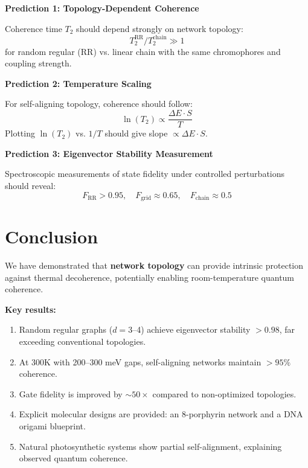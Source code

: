 \documentclass[11pt,a4paper]{article}
\theoremstyle{plain}
\theoremstyle{definition}
\theoremstyle{remark}
\begin{document}
\begin{prediction}
\textbf{Prediction 1: Topology-Dependent Coherence}

Coherence time $T_2$ should depend strongly on network topology:
\begin{equation}
T_2^{\text{RR}} / T_2^{\text{chain}} \gg 1
\end{equation}
for random regular (RR) vs. linear chain with the same chromophores and coupling strength.
\end{prediction}

\begin{prediction}
\textbf{Prediction 2: Temperature Scaling}

For self-aligning topology, coherence should follow:
\begin{equation}
\ln(T_2) \propto \frac{\Delta E \cdot S}{T}
\end{equation}
Plotting $\ln(T_2)$ vs. $1/T$ should give slope $\propto \Delta E \cdot S$.
\end{prediction}

\begin{prediction}
\textbf{Prediction 3: Eigenvector Stability Measurement}

Spectroscopic measurements of state fidelity under controlled perturbations should reveal:
\begin{equation}
F_{\text{RR}} > 0.95, \quad F_{\text{grid}} \approx 0.65, \quad F_{\text{chain}} \approx 0.5
\end{equation}
\end{prediction}

\section{Conclusion}

We have demonstrated that \textbf{network topology} can provide intrinsic protection against thermal decoherence, potentially enabling room-temperature quantum coherence.

\textbf{Key results:}
\begin{enumerate}
    \item Random regular graphs ($d = 3$--4) achieve eigenvector stability $>0.98$, far exceeding conventional topologies.
    
    \item At 300K with 200--300 meV gaps, self-aligning networks maintain $>95\%$ coherence.
    
    \item Gate fidelity is improved by $\sim 50\times$ compared to non-optimized topologies.
    
    \item Explicit molecular designs are provided: an 8-porphyrin network and a DNA origami blueprint.
    
    \item Natural photosynthetic systems show partial self-alignment, explaining observed quantum coherence.
\end{enumerate}
\end{document}

